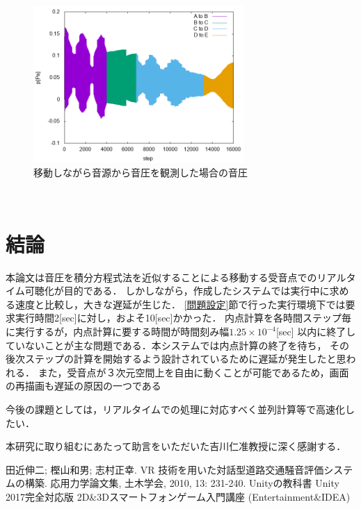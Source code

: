 \documentclass[dvipdfmx]{ampbt}
\begin{document}
\begin{figure}[H]
  \begin{center}
    \includegraphics[clip,width=8.0cm]{./png/kyoukai_all.png}
    \caption{移動しながら音源から音圧を観測した場合の音圧}
    \label{fig:kyoukai_all}
  \end{center}
\end{figure}\\




\section{結論}
本論文は音圧を積分方程式法を近似することによる移動する受音点でのリアルタイム可聴化が目的である．
しかしながら，作成したシステムでは実行中に求める速度と比較し，大きな遅延が生じた．
\ref{問題設定}節で行った実行環境下では要求実行時間2[sec]に対し，およそ10[sec]かかった．
内点計算を各時間ステップ毎に実行するが，内点計算に要する時間が時間刻み幅$1.25 \times 10^{-4}$[sec]
以内に終了していないことが主な問題である．本システムでは内点計算の終了を待ち，
その後次ステップの計算を開始するよう設計されているために遅延が発生したと思われる．
また，受音点が３次元空間上を自由に動くことが可能であるため，画面の再描画も遅延の原因の一つである\par
今後の課題としては，リアルタイムでの処理に対応すべく並列計算等で高速化したい．

\clearpage
\acknowledgment
本研究に取り組むにあたって助言をいただいた吉川仁准教授に深く感謝する．

\begin{thebibliography}{10}
田近伸二; 樫山和男; 志村正幸. VR 技術を用いた対話型道路交通騒音評価システムの構築. 応用力学論文集, 土木学会, 2010, 13: 231-240.
Unityの教科書 Unity 2017完全対応版 2D&3Dスマートフォンゲーム入門講座 (Entertainment&IDEA)
\end{thebibliography}
\end{document}
